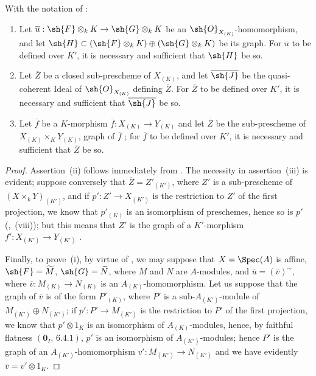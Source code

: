 \begin{lemma}[4.8.8]
\label{IV.4.8.8}
With the notation of :
\begin{enumerate}[label=(\roman*)]
  \item Let $\overline{u}:\sh{F}\otimes_k K\to\sh{G}\otimes_k K$ be an $\sh{O}_{X_{(K)}}$-homomorphism, and let $\sh{H}\subset(\sh{F}\otimes_k K)\oplus(\sh{G}\otimes_k K)$ be its graph.
For $\overline{u}$ to be defined over $K'$, it is necessary and sufficient that $\sh{H}$ be so.
  \item Let $\overline{Z}$ be a closed sub-prescheme of $X_{(K)}$, and let $\overline{\sh{J}}$ be the quasi-coherent Ideal of $\sh{O}_{X_{(K)}}$ defining $\overline{Z}$.
For $\overline{Z}$ to be defined over $K'$, it is necessary and sufficient that $\overline{\sh{J}}$ be so.
  \item Let $\overline{f}$ be a $K$-morphism $\overline{f}:X_{(K)}\to Y_{(K)}$ and let $\overline{Z}$ be the sub-prescheme of $X_{(K)}\times_K Y_{(K)}$, graph of $\overline{f}$ ; for $\overline{f}$ to be defined over $K'$, it is necessary and sufficient that $\overline{Z}$ be so.
\end{enumerate}
\end{lemma}

\begin{proof}
Assertion~(ii) follows immediately from .
The necessity in assertion~(iii) is evident; suppose conversely that $\overline{Z}=Z'_{(K')}$, where $Z'$ is a sub-prescheme of $(X\times_k Y)_{(K')}$, and if $p':Z'\to X_{(K')}$ is the restriction to $Z'$ of the first projection, we know that $p'_{(K)}$ is an isomorphism of preschemes, hence so is $p'$ (,~(viii)); but this means  that $Z'$ is the graph of a $K'$-morphism $f':X_{(K')}\to Y_{(K')}$ .

Finally, to prove~(i), by virtue of , we may suppose that $X=\Spec(A)$ is affine, $\sh{F}=\widetilde{M}$, $\sh{G}=\widetilde{N}$, where $M$ and $N$ are $A$-modules, and $\overline{u}=(\overline{v})^\sim$, where $\overline{v}:M_{(K)}\to N_{(K)}$ is an $A_{(K)}$-homomorphism.
Let us suppose that the graph of $\overline{v}$ is of the form $P'_{(K)}$, where $P'$ is a sub-$A_{(K')}$-module of $M_{(K')}\oplus N_{(K')}$; if $p':P'\to M_{(K')}$ is the restriction to $P'$ of the first projection, we know that $p'\otimes 1_K$ is an isomorphism of $A_{(K)}$-modules, hence, by faithful flatness $(\mathbf{0}_I,\,6.4.1)$, $p'$ is an isomorphism of $A_{(K')}$-modules; hence $P'$ is the graph of an $A_{(K')}$-homomorphism $v':M_{(K')}\to N_{(K')}$ and we have evidently $\overline{v}=v'\otimes 1_K$.
\end{proof}

